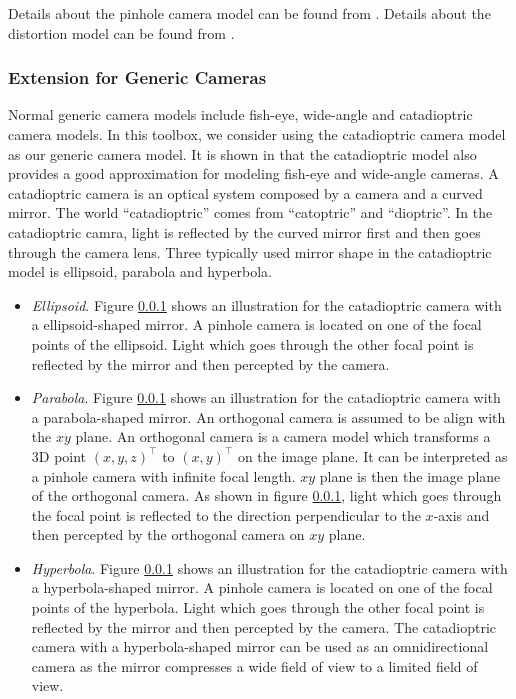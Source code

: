 \documentclass{report}
\begin{document}
Details about the pinhole camera model can be found from \cite{hartley2000multiple}. Details about the distortion model can be found from \cite{}. 

\subsubsection{Extension for Generic Cameras}
Normal generic camera models include fish-eye, wide-angle and catadioptric camera models. In this toolbox, we consider using the catadioptric camera model as our generic camera model. It is shown in \cite{} that the catadioptric model also provides a good approximation for modeling fish-eye and wide-angle cameras. A catadioptric camera is an optical system composed by a camera and a curved mirror. The world ``catadioptric'' comes from ``catoptric'' and ``dioptric''. In the catadioptric camra, light is reflected by the curved mirror first and then goes through the camera lens. Three typically used mirror shape in the catadioptric model is ellipsoid, parabola and hyperbola. 
\begin{itemize}
	\item \textit{Ellipsoid}. Figure \ref{} shows an illustration for the catadioptric camera with a ellipsoid-shaped mirror. A pinhole camera is located on one of the focal points of the ellipsoid. Light which goes through the other focal point is reflected by the mirror and then percepted by the camera. 
	\item \textit{Parabola}. Figure \ref{} shows an illustration for the catadioptric camera with a parabola-shaped mirror. An orthogonal camera is assumed to be align with the $xy$ plane. An orthogonal camera is a camera model which transforms a 3D point $(x, y, z)^\top$ to $(x, y)^\top$ on the image plane. It can be interpreted as a pinhole camera with infinite focal length. $xy$ plane is then the image plane of the orthogonal camera. As shown in figure \ref{}, light which goes through the focal point is reflected to the direction perpendicular to the $x$-axis and then percepted by the orthogonal camera on $xy$ plane. 
	\item \textit{Hyperbola}. Figure \ref{} shows an illustration for the catadioptric camera with a hyperbola-shaped mirror. A pinhole camera is located on one of the focal points of the hyperbola. Light which goes through the other focal point is reflected by the mirror and then percepted by the camera. The catadioptric camera with a hyperbola-shaped mirror can be used as an omnidirectional camera as the mirror compresses a wide field of view to a limited field of view. 
\end{itemize}
\end{document}
